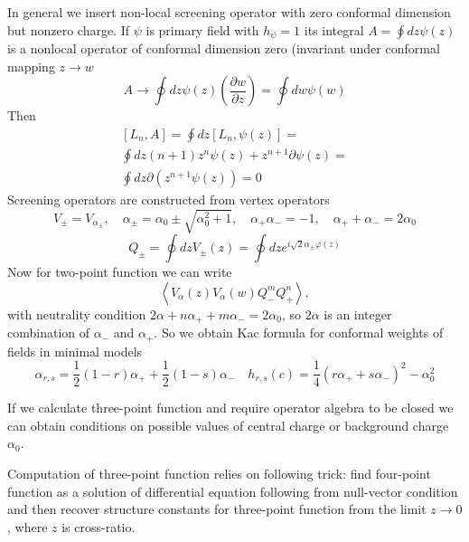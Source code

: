 \documentclass[a4paper,12pt]{article}
\theoremstyle{definition}
\theoremstyle{definition}
\theoremstyle{definition}
\begin{document}
In general we insert non-local screening operator with zero conformal dimension but nonzero charge.
If $\psi$ is primary field with $h_{\psi}=1$ its integral $  A=\oint dz \psi(z) $ is a nonlocal
operator of conformal dimension zero (invariant under conformal mapping $z\to w$ 
\begin{equation}
  \label{eq:50}
  A\to \oint dz \psi(z) \left(\frac{\partial w}{\partial z}\right)=\oint dw \psi(w)
\end{equation}
Then
\begin{multline}
  \label{eq:51}
  [L_{n},A]=\oint dz [L_{n},\psi(z)]=\\\oint dz  (n+1) z^{n}\psi(z)+z^{n+1}\partial \psi(z)=\\
  \oint dz \partial (z^{n+1}\psi (z))=0
\end{multline}
Screening operators are constructed from vertex operators
\begin{equation}
  \label{eq:52}
  V_{\pm}=V_{\alpha_{\pm}}, \quad \alpha_{\pm}=\alpha_{0}\pm \sqrt{\alpha_{0}^{2}+1}, \quad
  \alpha_{+}\alpha_{-}=-1,\quad \alpha_{+}+\alpha_{-}=2\alpha_{0}
\end{equation}
\begin{equation}
  \label{eq:53}
  Q_{\pm}=\oint dz V_{\pm}(z)=\oint dz e^{i\sqrt{2}\alpha_{\pm}\varphi(z)}
\end{equation}
Now for two-point function we can write
\begin{equation}
  \label{eq:54}
  \left<V_{\alpha}(z)V_{\alpha}(w)Q_{-}^{m}Q_{+}^{n}\right>,
\end{equation}
with neutrality condition $2\alpha+n\alpha_{+}+m\alpha_{-}=2\alpha_{0}$,  so $2\alpha$ is an integer
combination of $\alpha_{-}$ and $\alpha_{+}$.
So we obtain Kac formula for conformal weights of fields in minimal models
\begin{equation}
  \label{eq:55}
  \alpha_{r,s}=\frac{1}{2}(1-r)\alpha_{+}+\frac{1}{2}(1-s)\alpha_{-}\quad 
  h_{r,s}(c)=\frac{1}{4}(r\alpha_{+}+s\alpha_{-})^{2}-\alpha_{0}^{2}
\end{equation}

If we calculate three-point function and require operator algebra to be closed we can obtain
conditions on possible values of central charge or background charge $\alpha_{0}$. 

Computation of three-point function relies on following trick: find four-point function as a
solution of differential equation following from null-vector condition and then recover structure
constants for three-point function from the limit $z\to 0$, where $z$ is cross-ratio. 
\end{document}
